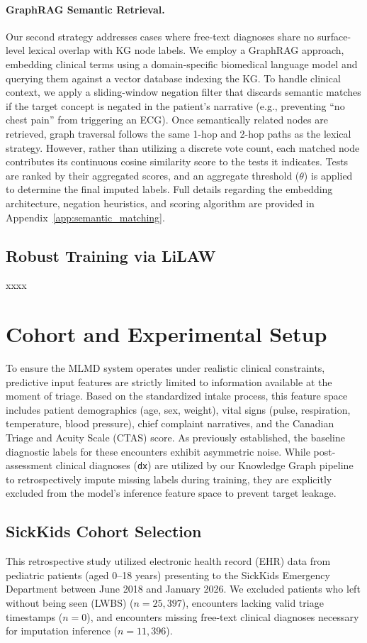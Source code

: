 \documentclass[pmlr]{jmlr}%
\begin{document}
\paragraph{GraphRAG Semantic Retrieval.}
Our second strategy addresses cases where free-text diagnoses share no surface-level lexical overlap with KG node labels. We employ a GraphRAG approach, embedding clinical terms using a domain-specific biomedical language model and querying them against a vector database indexing the KG. To handle clinical context, we apply a sliding-window negation filter that discards semantic matches if the target concept is negated in the patient's narrative (e.g., preventing ``no chest pain'' from triggering an ECG). Once semantically related nodes are retrieved, graph traversal follows the same 1-hop and 2-hop paths as the lexical strategy. However, rather than utilizing a discrete vote count, each matched node contributes its continuous cosine similarity score to the tests it indicates. Tests are ranked by their aggregated scores, and an aggregate threshold ($\theta$) is applied to determine the final imputed labels. Full details regarding the embedding architecture, negation heuristics, and scoring algorithm are provided in Appendix~\ref{app:semantic_matching}.

\subsection{Robust Training via LiLAW}
xxxx

\section{Cohort and Experimental Setup}
To ensure the MLMD system operates under realistic clinical constraints, predictive input features are strictly limited to information available at the moment of triage. Based on the standardized intake process, this feature space includes patient demographics (age, sex, weight), vital signs (pulse, respiration, temperature, blood pressure), chief complaint narratives, and the Canadian Triage and Acuity Scale (CTAS) score. As previously established, the baseline diagnostic labels for these encounters exhibit asymmetric noise. While post-assessment clinical diagnoses (\texttt{dx}) are utilized by our Knowledge Graph pipeline to retrospectively impute missing labels during training, they are explicitly excluded from the model's inference feature space to prevent target leakage.

\subsection{SickKids Cohort Selection}
This retrospective study utilized electronic health record (EHR) data from pediatric patients (aged 0–18 years) presenting to the SickKids Emergency Department between June 2018 and January 2026. We excluded patients who left without being seen (LWBS) ($n=25,397$), encounters lacking valid triage timestamps ($n=0$), and encounters missing free-text clinical diagnoses necessary for imputation inference ($n=11,396$).
\end{document}
